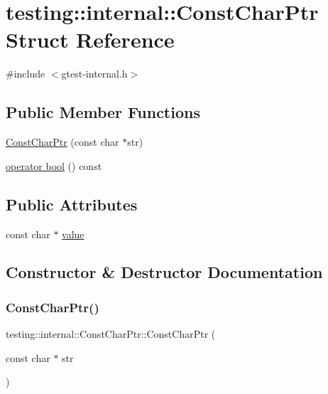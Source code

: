 \hypertarget{structtesting_1_1internal_1_1_const_char_ptr}{}\section{testing\+:\+:internal\+:\+:Const\+Char\+Ptr Struct Reference}
\label{structtesting_1_1internal_1_1_const_char_ptr}


{\ttfamily \#include $<$gtest-\/internal.\+h$>$}

\subsection*{Public Member Functions}
\begin{DoxyCompactItemize}
\item 
\hyperlink{structtesting_1_1internal_1_1_const_char_ptr_ae94f6453fa679d815994eccc63062907}{Const\+Char\+Ptr} (const char $\ast$str)
\item 
\hyperlink{structtesting_1_1internal_1_1_const_char_ptr_a85c8174b5d4db8fe96863509ba767b27}{operator bool} () const
\end{DoxyCompactItemize}
\subsection*{Public Attributes}
\begin{DoxyCompactItemize}
\item 
const char $\ast$ \hyperlink{structtesting_1_1internal_1_1_const_char_ptr_adba40d23d5986904b605946f643cf26e}{value}
\end{DoxyCompactItemize}


\subsection{Constructor \& Destructor Documentation}
\mbox{\label{structtesting_1_1internal_1_1_const_char_ptr_ae94f6453fa679d815994eccc63062907}} 
\subsubsection{\texorpdfstring{Const\+Char\+Ptr()}{ConstCharPtr()}}
{\footnotesize\ttfamily testing\+::internal\+::\+Const\+Char\+Ptr\+::\+Const\+Char\+Ptr (\begin{DoxyParamCaption}\item[{const char $\ast$}]{str }\end{DoxyParamCaption})\hspace{0.3cm}{\ttfamily [inline]}}



